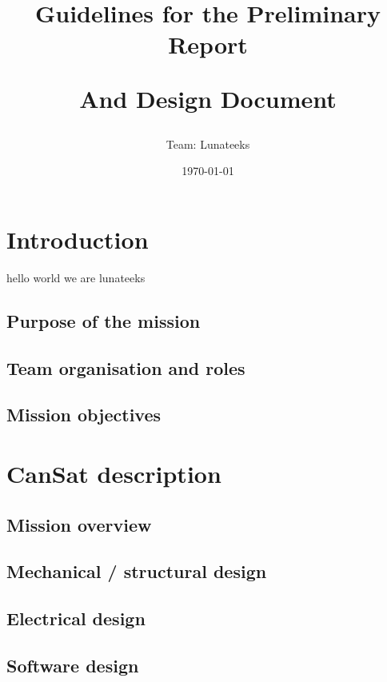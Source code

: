 \documentclass[11pt]{article}
\title{Guidelines for the Preliminary Report

And Design Document
}
\author{Team: Lunateeks}
\date{\today}
\begin{document}
\cansattitle

\tableofcontents
\pagestyle{plain}

\newpage

\section{Introduction}
hello world we are lunateeks

\subsection{Purpose of the mission}

\subsection{Team organisation and roles}

\subsection{Mission objectives}


\section{CanSat description}

\subsection{Mission overview}

\subsection{Mechanical / structural design}

\subsection{Electrical design}

\subsection{Software design}
\end{document}
